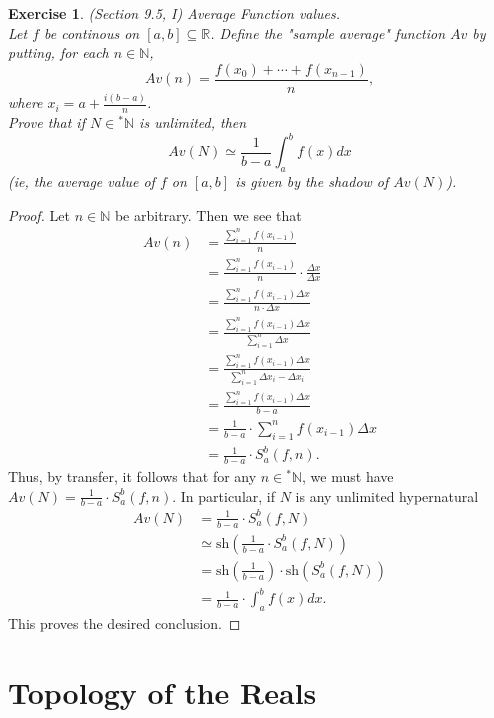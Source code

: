 \documentclass[a4paper, 11pt, openany]{book}
\theoremstyle{plain}
\newtheorem{exercise}{Exercise}[chapter]
\theoremstyle{plain}
\newcommand{\N}{\mathbb{N}}
\newcommand{\R}{\mathbb{R}}
\newcommand{\hyp}{{}^*}
\newcommand{\sh}{\text{sh}}
\newcommand{\Del}{\Delta}
\begin{document}
    \begin{exercise}
      (Section 9.5, I) Average Function values. \\
       Let $f$ be continous on $[a,b] \subseteq \R$. Define the "sample average" function $Av$ by putting, for each $n \in \N$, $$Av(n)=\frac{f(x_0)+\cdots + f(x_{n-1})}{n},$$
       where $x_i=a+\frac{i(b-a)}{n}$. \\ 
       Prove that if $N \in \hyp \N$ is unlimited, then $$Av(N) \simeq \frac{1}{b-a} \int_a^b f(x)dx$$ (ie, the average value of $f$ on $[a,b]$ is given by the shadow of $Av(N)$).
    \end{exercise}
    \begin{proof}
      Let $n \in \N$ be arbitrary. Then we see that 
      \begin{align*}
        Av(n) &= \frac{\sum_{i=1}^n f(x_{i-1})}{n} \\
        &= \frac{\sum_{i=1}^n f(x_{i-1})}{n} \cdot \frac{\Del x}{ \Del x} \\
        &=\frac{\sum_{i=1}^n f(x_{i-1}) \Del x}{n \cdot \Del x} \\
        &= \frac{\sum_{i=1}^n f(x_{i-1}) \Del x}{ \sum_{i=1}^n \Del x} \\
        &= \frac{\sum_{i=1}^n f(x_{i-1}) \Del x}{ \sum_{i=1}^n \Del x_i - \Del x_i} \\
        &=\frac{\sum_{i=1}^n f(x_{i-1}) \Del x}{b-a} \\
        &=\frac{1}{b-a} \cdot \sum_{i=1}^n f(x_{i-1}) \Del x \\
        &=\frac{1}{b-a} \cdot S_a^b (f, n).
      \end{align*}
      Thus, by transfer, it follows that for any $n \in \hyp \N$, we must have $Av(N)=\frac{1}{b-a} \cdot S_a^b (f, n)$. In particular, if $N$ is any unlimited hypernatural
      \begin{align*}
        Av(N) &=\frac{1}{b-a} \cdot S_a^b (f,N) \\
        &\simeq \sh \left( \frac{1}{b-a} \cdot S_a^b (f,N) \right) \\
        &= \sh \left( \frac{1}{b-a} \right) \cdot \sh( S_a^b (f,N)) \\
        &=\frac{1}{b-a} \cdot \int_a^b f(x) dx.
      \end{align*}
      This proves the desired conclusion.
    \end{proof}

\chapter{Topology of the Reals} 
\end{document}
